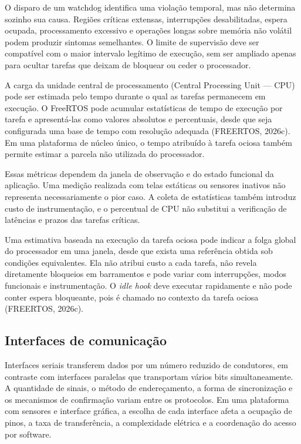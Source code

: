 \documentclass[a4paper,12pt]{article}
\begin{document}
O disparo de um watchdog identifica uma viola\c{c}\~ao temporal, mas n\~ao determina sozinho sua causa. Regi\~oes cr\'iticas extensas, interrup\c{c}\~oes desabilitadas, espera ocupada, processamento excessivo e opera\c{c}\~oes longas sobre mem\'oria n\~ao vol\'atil podem produzir sintomas semelhantes. O limite de supervis\~ao deve ser compat\'ivel com o maior intervalo leg\'itimo de execu\c{c}\~ao, sem ser ampliado apenas para ocultar tarefas que deixam de bloquear ou ceder o processador.


A carga da unidade central de processamento (Central Processing Unit --- CPU) pode ser estimada pelo tempo durante o qual as tarefas permanecem em execu\c{c}\~ao. O FreeRTOS pode acumular estat\'isticas de tempo de execu\c{c}\~ao por tarefa e apresent\'a-las como valores absolutos e percentuais, desde que seja configurada uma base de tempo com resolu\c{c}\~ao adequada (FREERTOS, 2026c). Em uma plataforma de n\'ucleo \'unico, o tempo atribu\'ido \`a tarefa ociosa tamb\'em permite estimar a parcela n\~ao utilizada do processador.


Essas m\'etricas dependem da janela de observa\c{c}\~ao e do estado funcional da aplica\c{c}\~ao. Uma medi\c{c}\~ao realizada com telas est\'aticas ou sensores inativos n\~ao representa necessariamente o pior caso. A coleta de estat\'isticas tamb\'em introduz custo de instrumenta\c{c}\~ao, e o percentual de CPU n\~ao substitui a verifica\c{c}\~ao de lat\^encias e prazos das tarefas cr\'iticas.


Uma estimativa baseada na execu\c{c}\~ao da tarefa ociosa pode indicar a folga global do processador em uma janela, desde que exista uma refer\^encia obtida sob condi\c{c}\~oes equivalentes. Ela n\~ao atribui custo a cada tarefa, n\~ao revela diretamente bloqueios em barramentos e pode variar com interrup\c{c}\~oes, modos funcionais e instrumenta\c{c}\~ao. O \emph{idle hook} deve executar rapidamente e n\~ao pode conter espera bloqueante, pois \'e chamado no contexto da tarefa ociosa (FREERTOS, 2026c).


\subsection{Interfaces de comunica\c{c}\~ao}


Interfaces seriais transferem dados por um n\'umero reduzido de condutores, em contraste com interfaces paralelas que transportam v\'arios bits simultaneamente. A quantidade de sinais, o m\'etodo de endere\c{c}amento, a forma de sincroniza\c{c}\~ao e os mecanismos de confirma\c{c}\~ao variam entre os protocolos. Em uma plataforma com sensores e interface gr\'afica, a escolha de cada interface afeta a ocupa\c{c}\~ao de pinos, a taxa de transfer\^encia, a complexidade el\'etrica e a coordena\c{c}\~ao do acesso por software.
\end{document}
